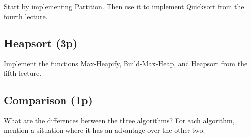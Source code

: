 \documentclass{article}
\begin{document}
Start by implementing {\sc Partition}. Then use it to implement {\sc Quicksort} from the fourth lecture.

\subsection*{Heapsort (3p)}

Implement the functions {\sc Max-Heapify}, {\sc Build-Max-Heap}, and {\sc Heapsort} from the fifth lecture.



\subsection*{Comparison (1p)}

What are the differences between the three algorithms? For each algorithm, mention a situation where it has an advantage over
the other two.
\end{document}
